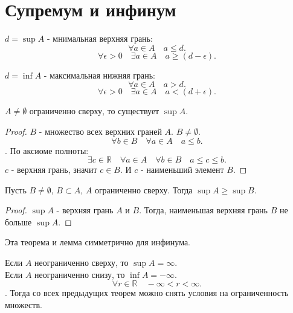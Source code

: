 \documentclass[11pt, oneside]{article}   	%
\begin{document}
\section{Супремум и инфинум}
    \begin{definition}
        $d=\sup A$ - мнимальная верхняя грань:
        \[ \forall{a \in A}\quad a\le   d.\] 
        \[\forall{\epsilon > 0}\quad \exists{a \in A}\quad a\ge  (d-\epsilon) .\] 
    \end{definition}
    \begin{definition}
        $d=\inf A$ - максимальная нижняя грань:
    \[ \forall{a \in A}\quad a>  d.\] 
    \[\forall{\epsilon > 0}\quad \exists{a \in A}\quad a< (d+\epsilon) .\] 
    \end{definition}
    \begin{theorem}
        $A \neq \emptyset$ ограниченно сверху, то существует $\sup A$.
         \begin{proof}
            $B$ - множество всех верхних граней  $A$.  $B \neq \emptyset$.
            \[ \forall{b \in B}\quad \forall{a \in A}\quad a\le b .\].
            По аксиоме полноты:
            \[ \exists{c \in \mathbb{R}}\quad \forall{a \in A}\quad \forall{b \in B}\quad a\le c\le b .\] 
            $c$ - верхняя грань, значит  $c \in B$. И $c$ - наименьший элемент  $B$.
        \end{proof}
        
    \end{theorem}
    \begin{tlemma}
        Пусть $B \neq \emptyset$, $B \subset A$, $A$ ограниченно сверху. Тогда  $\sup A \ge \sup B$.\\
        \begin{proof}
            $\sup A$ - верхняя грань  $A$ и $B$. Тогда, наименьшая верхняя грань  $B$ не больше  $\sup A$.
        \end{proof}
    \end{tlemma}
    Эта теорема и лемма симметрично для инфинума.
    \begin{definition}
        Если $A$ неограниченно сверху, то  $\sup A = \infty$.\\
        Если $A$ неограниченно снизу, то  $\inf A = -\infty$.
        \[ \forall{r \in \mathbb{R}}\quad -\infty < r < \infty .\].
        Тогда со всех предыдущих теорем можно снять условия на ограниченность множеств.
    \end{definition}
\end{document}
